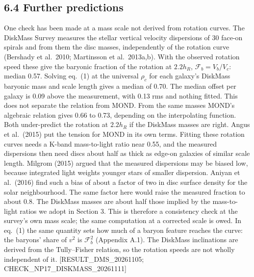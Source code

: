 \documentclass[
  10pt,
]{article}
\begin{document}
\subsection{6.4 Further predictions}

One check has been made at a mass scale not derived from rotation curves. The DiskMass Survey measures the stellar vertical velocity dispersions of 30 face-on spirals and from them the disc masses, independently of the rotation curve (Bershady et al.~2010; Martinsson et al.~2013a,b). With the observed rotation speed these give the baryonic fraction of the rotation at $2.2h_R$, $\mathcal{F}_b=V_b/V_c$: median 0.57. Solving eq.~(1) at the universal $\rho_c$ for each galaxy's DiskMass baryonic mass and scale length gives a median of 0.70. The median offset per galaxy is 0.09 above the measurement, with 0.13 rms and nothing fitted. This does not separate the relation from MOND. From the same masses MOND's algebraic relation gives 0.66 to 0.73, depending on the interpolating function. Both under-predict the rotation at $2.2h_R$ if the DiskMass masses are right. Angus et al.~(2015) put the tension for MOND in its own terms. Fitting these rotation curves needs a K-band mass-to-light ratio near 0.55, and the measured dispersions then need discs about half as thick as edge-on galaxies of similar scale length. Milgrom (2015) argued that the measured dispersions may be biased low, because integrated light weights younger stars of smaller dispersion. Aniyan et al.~(2016) find such a bias of about a factor of two in disc surface density for the solar neighbourhood. The same factor here would raise the measured fraction to about 0.8. The DiskMass masses are about half those implied by the mass-to-light ratios we adopt in Section 3. This is therefore a consistency check at the survey's own mass scale; the same computation at a corrected scale is owed. In eq.~(1) the same quantity sets how much of a baryon feature reaches the curve: the baryons' share of $v^2$ is $\mathcal{F}_b^2$ (Appendix A.1). The DiskMass inclinations are derived from the Tully--Fisher relation, so the rotation speeds are not wholly independent of it. {[}RESULT\_DMS\_20261105; CHECK\_NP17\_DISKMASS\_20261111{]}
\end{document}
